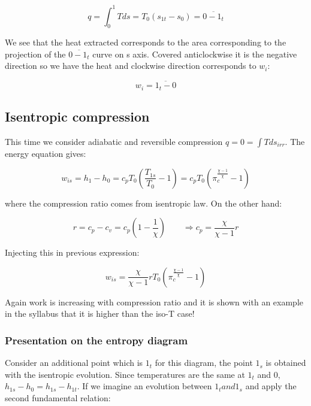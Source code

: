 \begin{equation}
q = \int _0 ^1 Tds = T_0 (s_{1t}- s_0) = \overline{0 - 1_t}
\end{equation}

We see that the heat extracted corresponds to the area corresponding to the projection of the $\overline{0-1_t}$ curve on s axis. Covered anticlockwise it is the negative direction so we have the heat and clockwise direction corresponds to $w_i$: 

\begin{equation}
w_i = \overline{1_t - 0}
\end{equation} 

\subsection{Isentropic compression}
This time we consider adiabatic and reversible compression $q=0 = \int Tds_{irr}$. The energy equation gives: 

\begin{equation}
w_{is} = h_1 - h_0 = c_p T_0 \left(\frac{T_{1s}}{T_0} - 1\right) = c_p T_0 \left(\pi ^{\frac{\chi - 1}{\chi}} _c- 1\right)
\end{equation}

where the compression ratio comes from isentropic law. On the other hand: 

\begin{equation}
r = c_p - c_v = c_p \left( 1 - \frac{1}{\chi} \right) \qquad \Rightarrow c_p = \frac{\chi}{\chi -1} r
\end{equation}

Injecting this in previous expression: 

\begin{equation}
w_{is} = \frac{\chi}{\chi -1} r T_0 \left(\pi ^{\frac{\chi - 1}{\chi}} _c- 1\right)
\end{equation}

Again work is increasing with compression ratio and it is shown with an example in the syllabus that it is higher than the iso-T case! 

\subsubsection{Presentation on the entropy diagram}
Consider an additional point which is $1_t$ for this diagram, the point $1_s$ is obtained with the isentropic evolution. Since temperatures are the same at $1_t$ and $0$, $h_{1s} - h_0 = h_{1s} - h_{1t}$. If we imagine an evolution between $1_t and 1_s$ and apply the second fundamental relation: 

